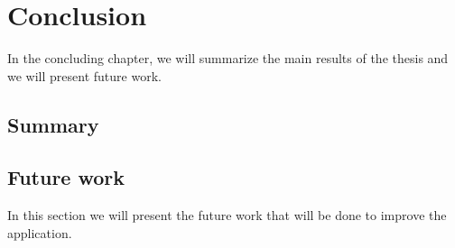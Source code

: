 \chapter{Conclusion}\label{cap:conclusion}
In the concluding chapter, we will summarize the main results of the thesis and we will present future work.
\section{Summary}
\section{Future work}
In this section we will present the future work that will be done to improve the application.
